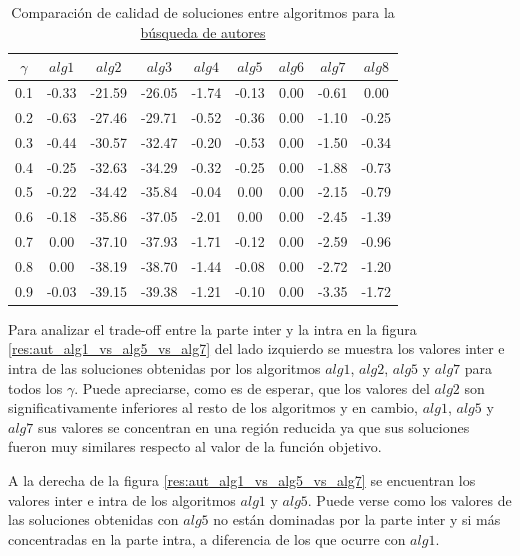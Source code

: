 \begin{table}[H]
\begin{center}
\begin{tabular}{|c|c|c|c|c|c|c|c|c|}
\hline
$\gamma$&$alg1$&$alg2$&$alg3$&$alg4$&$alg5$&$alg6$&$alg7$&$alg8$ \\ \hline
0.1 & -0.33 & -21.59 & -26.05 & -1.74 & -0.13 & 0.00 & -0.61 & 0.00 \\
0.2 & -0.63 & -27.46 & -29.71 & -0.52 & -0.36 & 0.00 & -1.10 & -0.25 \\
0.3 & -0.44 & -30.57 & -32.47 & -0.20 & -0.53 & 0.00 & -1.50 & -0.34 \\
0.4 & -0.25 & -32.63 & -34.29 & -0.32 & -0.25 & 0.00 & -1.88 & -0.73 \\
0.5 & -0.22 & -34.42 & -35.84 & -0.04 & 0.00 & 0.00 & -2.15 & -0.79 \\
0.6 & -0.18 & -35.86 & -37.05 & -2.01 & 0.00 & 0.00 & -2.45 & -1.39 \\
0.7 & 0.00 & -37.10 & -37.93 & -1.71 & -0.12 & 0.00 & -2.59 & -0.96 \\ 
0.8 & 0.00 & -38.19 & -38.70 & -1.44 & -0.08 & 0.00 & -2.72 & -1.20 \\
0.9 & -0.03 & -39.15 & -39.38 & -1.21 & -0.10 & 0.00 & -3.35 & -1.72 \\ \hline 
\end{tabular}
\caption{Comparación de calidad de soluciones entre algoritmos para la \hyperref[busqueda:autores]{búsqueda de autores}} 
\label{tabla:comp2}
\end{center}
\end{table}

Para analizar el trade-off entre la parte inter y la intra en la figura \ref{res:aut_alg1_vs_alg5_vs_alg7} del lado izquierdo se muestra los valores inter e intra de las soluciones obtenidas por los algoritmos $alg1$, $alg2$, $alg5$ y $alg7$ para todos los $\gamma$. Puede apreciarse, como es de esperar, que los valores del $alg2$ son significativamente inferiores al resto de los algoritmos y en cambio, $alg1$, $alg5$ y $alg7$ sus valores se concentran en una región reducida ya que sus soluciones fueron muy similares respecto al valor de la función objetivo.

A la derecha de la figura \ref{res:aut_alg1_vs_alg5_vs_alg7} se encuentran los valores inter e intra de los algoritmos $alg1$ y $alg5$. Puede verse como los valores de las soluciones obtenidas con $alg5$ no están dominadas por la parte inter y si más concentradas en la parte intra, a diferencia de los que ocurre con $alg1$.

